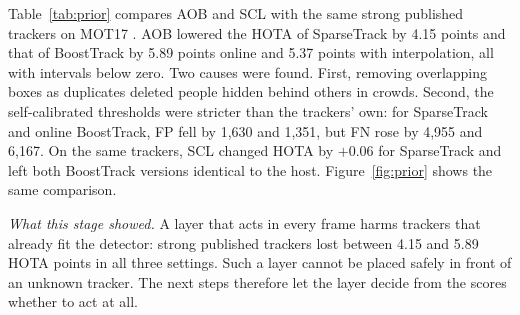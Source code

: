 \documentclass[pdflatex,sn-mathphys-num]{sn-jnl}
\newcommand{\scl}{SCL}
\newcommand{\aob}{AOB}
\begin{document}
Table~\ref{tab:prior} compares \aob{} and \scl{} with the same strong
published trackers on MOT17 \cite{milan2016mot16}. \aob{} lowered the HOTA of
SparseTrack by 4.15 points and that of BoostTrack by 5.89 points online and
5.37 points with interpolation, all with intervals below zero. Two causes
were found. First, removing overlapping boxes as duplicates deleted people
hidden behind others in crowds. Second, the self-calibrated thresholds were
stricter than the trackers' own: for SparseTrack and online BoostTrack, FP
fell by 1,630 and 1,351, but FN rose by 4,955 and 6,167. On the same trackers, \scl{} changed HOTA by $+0.06$ for SparseTrack
and left both BoostTrack versions identical to the host.
Figure~\ref{fig:prior} shows the same comparison.

\emph{What this stage showed.} A layer that acts in every frame harms
trackers that already fit the detector: strong published trackers lost
between 4.15 and 5.89 HOTA points in all three settings. Such a layer cannot
be placed safely in front of an unknown tracker. The next steps therefore let
the layer decide from the scores whether to act at all.
\end{document}
